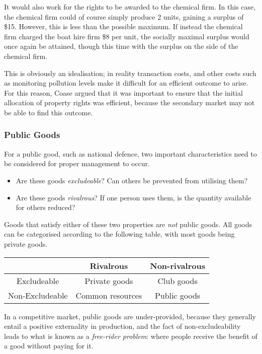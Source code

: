 \documentclass[12pt]{report}
\begin{document}
\begin{flushleft}
\bigskip
It would also work for the rights to be awarded to the chemical firm. In this
case, the chemical firm could of course simply produce 2 units, gaining a 
surplus of \$15. However, this is less than the possible maximum. If instead
the chemical firm charged the boat hire firm \$8 per unit, the socially
maximal surplus would once again be attained, though this time with the surplus
on the side of the chemical firm.

\bigskip
This is obviously an idealisation; in reality transaction costs, and other 
costs such as monitoring pollution levels make it difficult for an efficient
outcome to arise. For this reason, Coase argued that it was important to ensure
that the initial allocation of property rights was efficient, because the 
secondary market may not be able to find this outcome.

\subsubsection*{Public Goods}
For a public good, such as national defence, two important characteristics need
to be considered for proper management to occur.
\begin{itemize}
    \item Are these goods \textit{excludeable}? Can others be prevented from
    utilising them?
    \item Are these goods \textit{rivalrous}? If one person uses them, is the
    quantity available for others reduced?
\end{itemize}
Goods that satisfy either of these two properties are \textit{not} public 
goods. All goods can be categorised according to the following table, with
most goods being private goods.

\begin{center}
    \begin{tabular}{c|c|c|}
        & Rivalrous & Non-rivalrous \\
        \hline
        Excludeable & Private goods & Club goods \\
        \hline
        Non-Excludeable & Common resources & Public goods \\
        \hline
    \end{tabular}        
\end{center}

In a competitive market, public goods are under-provided, because they 
generally entail a positive externality in production, and the fact of 
non-excludeability leads to what is known as a \textit{free-rider problem}:
where people receive the benefit of a good without paying for it. 


\end{flushleft}
\end{document}
